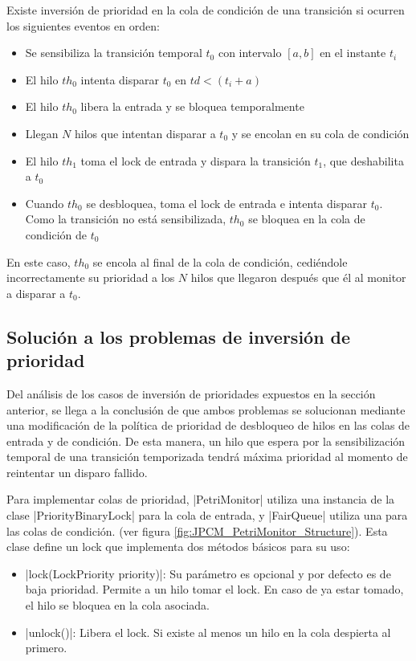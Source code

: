 Existe inversión de prioridad en la cola de condición de una transición si
ocurren los siguientes eventos en orden:
\begin{itemize}
  \item Se sensibiliza la transición temporal $t_{0}$ con intervalo $[a,b]$ en
  el instante $t_{i}$
  \item El hilo $th_{0}$ intenta disparar $t_{0}$ en $td < (t_{i} + a)$
  \item El hilo $th_{0}$ libera la entrada y se bloquea temporalmente
  \item Llegan $N$ hilos que intentan disparar a $t_{0}$ y se encolan en su cola
  de condición
  \item El hilo $th_{1}$ toma el lock de entrada y dispara la transición
  $t_{1}$, que deshabilita a $t_{0}$
  \item Cuando $th_{0}$ se desbloquea, toma el lock de entrada e intenta
  disparar $t_{0}$. Como la transición no está sensibilizada, $th_{0}$ se
  bloquea en la cola de condición de $t_{0}$
\end{itemize}
 
En este caso, $th_{0}$ se encola al final de la cola de condición, cediéndole
incorrectamente su prioridad a los $N$ hilos que llegaron después que él al
monitor a disparar a $t_{0}$.

\subsection{Solución a los problemas de inversión de prioridad}
\label{JPCM_solucion_inv_prioridad}

Del análisis de los casos de inversión de prioridades expuestos en la sección
anterior, se llega a la conclusión de que ambos problemas se solucionan mediante
una modificación de la política de prioridad de desbloqueo de hilos en las colas
de entrada y de condición. De esta manera, un hilo que espera por la
sensibilización temporal de una transición temporizada tendrá máxima prioridad
al momento de reintentar un disparo fallido.

Para implementar colas de prioridad, |PetriMonitor| utiliza una
instancia de la clase |PriorityBinaryLock| para la cola de entrada,
y |FairQueue| utiliza una para las colas de condición. (ver figura
\ref{fig:JPCM_PetriMonitor_Structure}).
Esta clase define un lock que implementa dos métodos básicos para su uso:
\begin{itemize}
  \item {}|lock(LockPriority priority)|: Su parámetro es opcional y por
  defecto es de baja prioridad. Permite a un hilo tomar el lock. En caso de ya
  estar tomado, el hilo se bloquea en la cola asociada.
  \item {}|unlock()|: Libera el lock. Si existe al menos un hilo en la
  cola despierta al primero.
\end{itemize}

